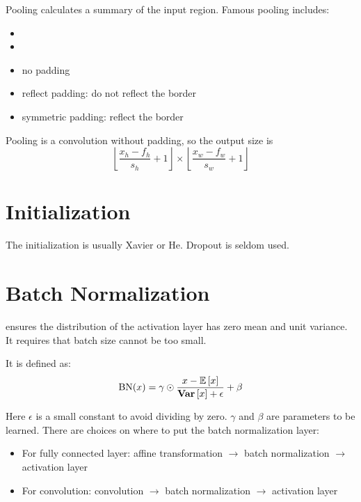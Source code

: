 Pooling calculates a summary of the input region. Famous pooling includes:
\begin{itemize}
    \item {}
    \item {}
    \item no padding
    \item reflect padding: do not reflect the border
    \item symmetric padding: reflect the border
\end{itemize}


            
            
            
Pooling is a convolution without padding, so the output size is
\begin{equation}
    \left\lfloor \frac{x_h - f_h}{s_h} + 1 \right\rfloor \times \left\lfloor \frac{x_w - f_w}{s_w} + 1 \right\rfloor
\end{equation}



\section{Initialization}

The initialization is usually Xavier or He. Dropout is seldom used.



\section{Batch Normalization}

 ensures the distribution of the activation layer has zero mean and unit variance. It requires that batch size cannot be too small. 

It is defined as:
\begin{equation}
    \text{BN}(x) = \gamma \odot \frac{x - \mathbb{E}\left[{x}\right]}{\mathop{\bf Var\/}\left[\displaystyle x \right] + \epsilon} + \beta
\end{equation}

Here $\epsilon$ is a small constant to avoid dividing by zero. $\gamma$ and $\beta$ are parameters to be learned. There are choices on where to put the batch normalization layer:
\begin{itemize}
    \item For fully connected layer: affine transformation $\rightarrow$ batch normalization $\rightarrow$ activation layer
    \item For convolution: convolution $\rightarrow$ batch normalization $\rightarrow$ activation layer
\end{itemize}

